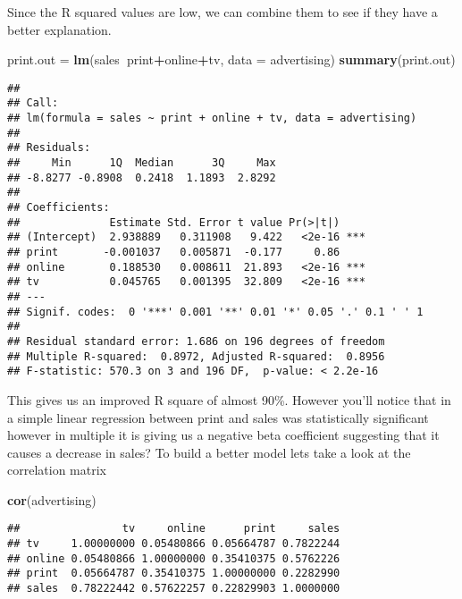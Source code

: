 \documentclass[
]{article}
\newenvironment{Shaded}{\begin{snugshade}}{\end{snugshade}}
\newcommand{\DataTypeTok}[1]{\textcolor[rgb]{0.13,0.29,0.53}{#1}}
\newcommand{\KeywordTok}[1]{\textcolor[rgb]{0.13,0.29,0.53}{\textbf{#1}}}
\newcommand{\NormalTok}[1]{#1}
\newcommand{\OperatorTok}[1]{\textcolor[rgb]{0.81,0.36,0.00}{\textbf{#1}}}
\newcommand{\StringTok}[1]{\textcolor[rgb]{0.31,0.60,0.02}{#1}}
\begin{document}
Since the R squared values are low, we can combine them to see if they
have a better explanation.

\begin{Shaded}
\begin{Highlighting}[]
\NormalTok{print.out =}\StringTok{ }\KeywordTok{lm}\NormalTok{(sales}\OperatorTok{~}\NormalTok{print}\OperatorTok{+}\NormalTok{online}\OperatorTok{+}\NormalTok{tv, }\DataTypeTok{data =}\NormalTok{ advertising)}
\KeywordTok{summary}\NormalTok{(print.out)}
\end{Highlighting}
\end{Shaded}

\begin{verbatim}
## 
## Call:
## lm(formula = sales ~ print + online + tv, data = advertising)
## 
## Residuals:
##     Min      1Q  Median      3Q     Max 
## -8.8277 -0.8908  0.2418  1.1893  2.8292 
## 
## Coefficients:
##              Estimate Std. Error t value Pr(>|t|)    
## (Intercept)  2.938889   0.311908   9.422   <2e-16 ***
## print       -0.001037   0.005871  -0.177     0.86    
## online       0.188530   0.008611  21.893   <2e-16 ***
## tv           0.045765   0.001395  32.809   <2e-16 ***
## ---
## Signif. codes:  0 '***' 0.001 '**' 0.01 '*' 0.05 '.' 0.1 ' ' 1
## 
## Residual standard error: 1.686 on 196 degrees of freedom
## Multiple R-squared:  0.8972, Adjusted R-squared:  0.8956 
## F-statistic: 570.3 on 3 and 196 DF,  p-value: < 2.2e-16
\end{verbatim}

This gives us an improved R square of almost 90\%. However you'll notice
that in a simple linear regression between print and sales was
statistically significant however in multiple it is giving us a negative
beta coefficient suggesting that it causes a decrease in sales? To build
a better model lets take a look at the correlation matrix

\begin{Shaded}
\begin{Highlighting}[]
\KeywordTok{cor}\NormalTok{(advertising)}
\end{Highlighting}
\end{Shaded}

\begin{verbatim}
##                tv     online      print     sales
## tv     1.00000000 0.05480866 0.05664787 0.7822244
## online 0.05480866 1.00000000 0.35410375 0.5762226
## print  0.05664787 0.35410375 1.00000000 0.2282990
## sales  0.78222442 0.57622257 0.22829903 1.0000000
\end{verbatim}
\end{document}
